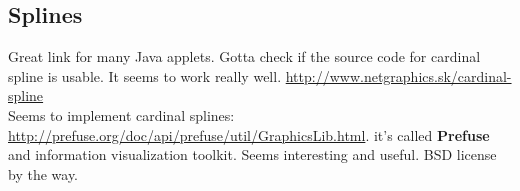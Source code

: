 \documentclass{article}
\begin{document}
\subsection{Splines}
Great link for many Java applets. Gotta check if the source code for
cardinal spline is usable. It seems to work really well.
\url{http://www.netgraphics.sk/cardinal-spline}\\

Seems to implement cardinal splines: \url{http://prefuse.org/doc/api/prefuse/util/GraphicsLib.html}. it's called \textbf{Prefuse} and information visualization
toolkit. Seems interesting and useful. BSD license by the way.
\end{document}
